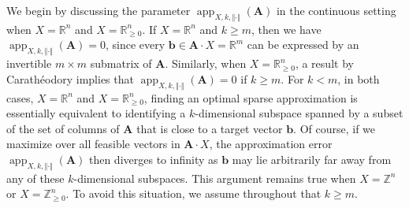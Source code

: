 \documentclass[pdflatex]{sn-jnl}
\DeclareMathOperator{\app}{app}
\newcommand{\R}{\mathbb{R}}
\newcommand{\Z}{\mathbb{Z}}
\newcommand{\bA}{\bm{A}}
\newcommand{\bb}{\bm{b}}
\theoremstyle{thmstyleone}%
\theoremstyle{thmstyletwo}%
\theoremstyle{thmstylethree}%
\begin{document}
	We begin by discussing the parameter $\app_{X,k,\Vert\cdot\Vert}(\bA)$ in the continuous setting when $X = \R^n$ and $X = \R^n_{\geq 0}$. If $X = \R^n$ and $k\geq m$, then we have
	$\app_{X,k,\Vert\cdot\Vert}(\bA) = 0$, since every $\bb\in \bA\cdot X = \R^m$ can be expressed by an invertible $m\times m$ submatrix of $\bA$. 
	Similarly, when $X = \R^n_{\geq 0}$, a result by Carath\'eodory implies that $\app_{X,k,\Vert\cdot\Vert}(\bA) = 0$ if $k\geq m$. For $k < m$, in both cases, $X = \R^n$ and $X = \R^n_{\geq 0}$, finding an optimal sparse approximation is essentially equivalent to identifying a $k$-dimensional subspace spanned by a subset of the set of columns of $\bA$ that is close to a target vector $\bb$. Of course, if we maximize over all
	feasible vectors in $\bA\cdot X$, the approximation error
	$\app_{X,k,\Vert\cdot\Vert}(\bA)$ then diverges to infinity as $\bb$ may lie
	arbitrarily far away from any of these $k$-dimensional subspaces. 
	This argument remains true when $X = \Z^n$ or $X = \Z^n_{\geq 0}$.
	To avoid this situation, we assume throughout that $k \geq m$.
	
\end{document}
